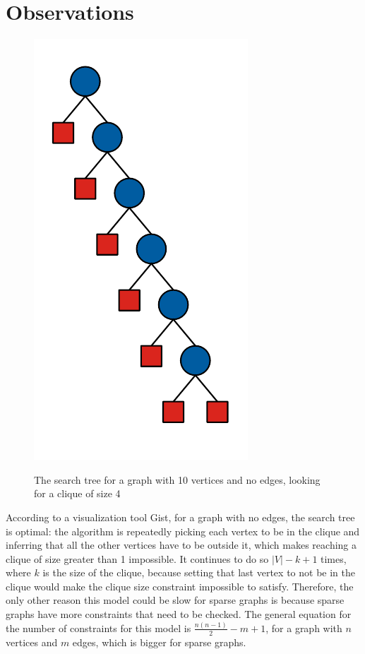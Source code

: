 \documentclass{article}
\theoremstyle{definition}
\begin{document}
\section{Observations}
\begin{figure}
  \includegraphics[scale=0.5]{search_tree.pdf}
  \label{fig:search_tree}
  \caption{The search tree for a graph with 10 vertices and no edges, looking for a clique of size 4}
\end{figure}
According to a visualization tool Gist, for a graph with no edges, the search tree is optimal: the algorithm is repeatedly picking each vertex to be in the clique and inferring that all the other vertices have to be outside it, which makes reaching a clique of size greater than 1 impossible. It continues to do so $|V|-k+1$ times, where $k$ is the size of the clique, because setting that last vertex to not be in the clique would make the clique size constraint impossible to satisfy. Therefore, the only other reason this model could be slow for sparse graphs is because sparse graphs have more constraints that need to be checked. The general equation for the number of constraints for this model is $\frac{n(n-1)}{2}-m+1$, for a graph with $n$ vertices and $m$ edges, which is bigger for sparse graphs.
\end{document}
